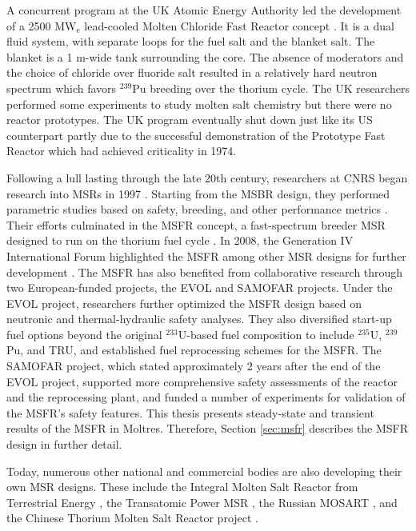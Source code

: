 A concurrent program at the UK Atomic Energy Authority led the
development of a 2500 MW$_{\text{e}}$ lead-cooled Molten Chloride Fast Reactor
concept \cite{smith_assessment_1974}. It is a dual fluid system,
with separate loops for the fuel salt and the blanket salt. The blanket is a
1 m-wide tank surrounding the core. The absence of moderators and the choice
of chloride over fluoride salt resulted in a relatively hard neutron spectrum
which favors $^{239}$Pu breeding over the thorium cycle. The UK researchers
performed some experiments to study molten salt chemistry but there were no
reactor prototypes. The UK program eventually shut down just like its
US counterpart partly due to the successful demonstration of the Prototype
Fast Reactor which had achieved criticality in 1974.

Following a lull lasting through the late 20th century, researchers at
\gls{CNRS} began research into \glspl{MSR} in 1997
\cite{heuer_simulation_2010}. Starting from the \gls{MSBR} design, they
performed parametric studies based on safety, breeding, and
other performance metrics \cite{mathieu_thorium_2006}. Their efforts
culminated in the \gls{MSFR} concept, a fast-spectrum breeder \gls{MSR}
designed to run on the thorium fuel cycle \cite{merle_optimized_2007}. In
2008, the Generation IV International Forum highlighted the \gls{MSFR} among
other \gls{MSR} designs for further development \cite{gif_generation_2008}.
The \gls{MSFR} has also benefited from collaborative research through two
European-funded projects, the \gls{EVOL} \cite{euratom_final_2015} and
\gls{SAMOFAR} \cite{kloosterman_20_2017} projects. Under the \gls{EVOL}
project, researchers further optimized the \gls{MSFR} design based on
neutronic and thermal-hydraulic safety analyses. They also diversified
start-up fuel options beyond the original $^{233}$U-based fuel composition to
include $^{235}$U, $^{239}$Pu, and \gls{TRU}, and established fuel
reprocessing schemes for the \gls{MSFR}. The \gls{SAMOFAR} project, which
stated approximately 2 years after the end of the \gls{EVOL} project,
supported more comprehensive safety assessments of the reactor and the
reprocessing plant, and funded a number of experiments for validation of the
\gls{MSFR}'s safety features. This thesis presents steady-state and
transient results of the \gls{MSFR} in Moltres. Therefore, Section
\ref{sec:msfr} describes the \gls{MSFR} design in further detail.

Today, numerous other national and commercial
bodies are also developing their own \gls{MSR} designs. These include the
Integral Molten Salt Reactor from Terrestrial Energy
\cite{leblanc_integral_2015}, the Transatomic Power \gls{MSR}
\cite{transatomic_power_corporation_technical_2016}, the Russian \gls{MOSART}
\cite{ignatiev_molten_2014}, and the Chinese Thorium Molten Salt Reactor
project \cite{zhang_review_2018}.

